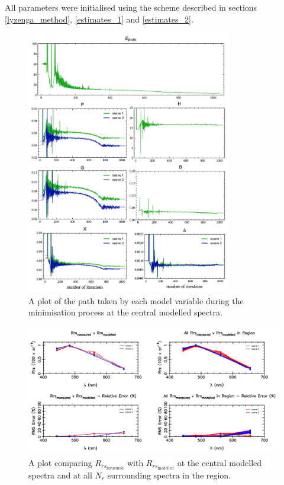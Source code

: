 \documentclass[12pt]{article}
\numberwithin{equation}{section}
\begin{document}
All parameters were initialised using the scheme described in sections \ref{lyzenga_method}, 
\ref{estimates_1} and \ref{estimates_2}.

\begin{figure}[H]
\centering
\includegraphics[width=0.8\textwidth]{model_path.png}
\caption{A plot of the path taken by each model variable during the minimisation process at the 
central modelled spectra.}
\end{figure}

\begin{figure}[H]
\centering
\includegraphics[width=1.0\textwidth]{Rrs_simulation_plot.png}
\caption{A plot comparing $R_{rs_{\text{measured}}}$ with $R_{rs_{\text{modelled}}}$ at 
the central modelled spectra and at all $N_r$ surrounding spectra in the region.}
\end{figure}
\end{document}
